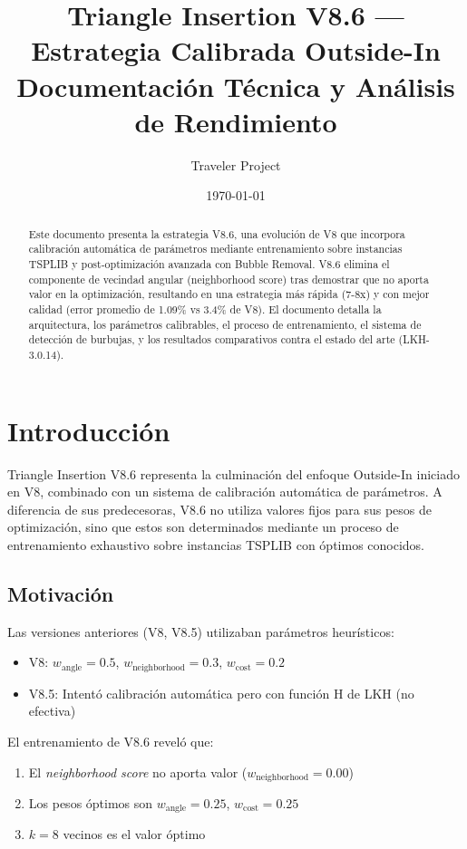 \documentclass[12pt, a4paper]{article}
\title{\textbf{Triangle Insertion V8.6 --- Estrategia Calibrada Outside-In}\\
\large Documentación Técnica y Análisis de Rendimiento}
\author{Traveler Project}
\date{\today}
\begin{document}
\maketitle

\begin{abstract}
Este documento presenta la estrategia V8.6, una evolución de V8 que incorpora calibración automática de parámetros mediante entrenamiento sobre instancias TSPLIB y post-optimización avanzada con Bubble Removal. V8.6 elimina el componente de vecindad angular (neighborhood score) tras demostrar que no aporta valor en la optimización, resultando en una estrategia más rápida (7-8x) y con mejor calidad (error promedio de 1.09\% vs 3.4\% de V8). El documento detalla la arquitectura, los parámetros calibrables, el proceso de entrenamiento, el sistema de detección de burbujas, y los resultados comparativos contra el estado del arte (LKH-3.0.14).
\end{abstract}

\tableofcontents

\section{Introducción}

Triangle Insertion V8.6 representa la culminación del enfoque Outside-In iniciado en V8, combinado con un sistema de calibración automática de parámetros. A diferencia de sus predecesoras, V8.6 no utiliza valores fijos para sus pesos de optimización, sino que estos son determinados mediante un proceso de entrenamiento exhaustivo sobre instancias TSPLIB con óptimos conocidos.

\subsection{Motivación}

Las versiones anteriores (V8, V8.5) utilizaban parámetros heurísticos:
\begin{itemize}
    \item V8: $w_{\text{angle}} = 0.5$, $w_{\text{neighborhood}} = 0.3$, $w_{\text{cost}} = 0.2$
    \item V8.5: Intentó calibración automática pero con función H de LKH (no efectiva)
\end{itemize}

El entrenamiento de V8.6 reveló que:
\begin{enumerate}
    \item El \textit{neighborhood score} no aporta valor ($w_{\text{neighborhood}} = 0.00$)
    \item Los pesos óptimos son $w_{\text{angle}} = 0.25$, $w_{\text{cost}} = 0.25$
    \item $k = 8$ vecinos es el valor óptimo
\end{enumerate}
\end{document}
